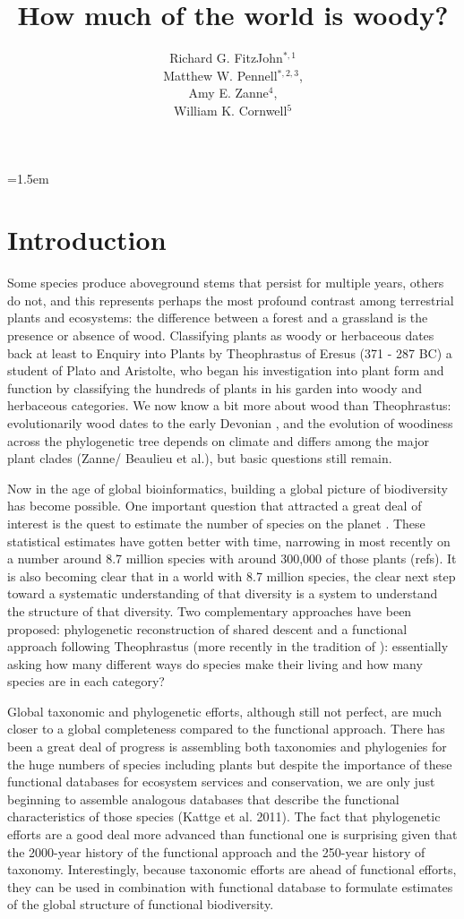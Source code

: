 \documentclass[12pt]{article}
\title{How much of the world is woody?}
\author{
Richard G. FitzJohn$^{*,1}$\\ Matthew W. Pennell$^{*,2,3}$,\\ Amy E. Zanne$^{4}$,\\ William K. Cornwell$^{5}$
}
\date{}
\affiliation{\noindent
$^*$ These authors contributed equally}
\begin{document}
\mstitlepage
\parindent=1.5em
\addtolength{\parskip}{.3em}

\section{Introduction}

Some species produce aboveground stems that persist for multiple years, others do not, and this represents perhaps the most profound contrast among terrestrial plants and ecosystems: the difference between a forest and a grassland is the presence or absence of wood. Classifying plants as woody or herbaceous dates back at least to Enquiry into Plants by Theophrastus of Eresus (371 - 287 BC) a student of Plato and Aristolte, who began his investigation into plant form and function by classifying the hundreds of plants in his garden into woody and herbaceous categories.  We now know a bit more about wood than Theophrastus: evolutionarily wood dates to the early Devonian \citep[~400 mya;][]{gerrienne2011simple}, and the evolution of woodiness across the phylogenetic tree depends on climate and differs among the major plant clades (Zanne/ Beaulieu et al.), but basic questions still remain.

Now in the age of global bioinformatics, building a global picture of biodiversity has become possible.  One important question that attracted a great deal of interest is the quest to estimate the number of species on the planet \citep{may1988many,erwin1991many, stork1993many, mora2011plos}.  These statistical estimates have gotten better with time, narrowing in most recently on a number around 8.7 million species with around 300,000 of those plants (refs).  It is also becoming clear that in a world with 8.7 million species, the clear next step toward a systematic understanding of that diversity is a system to understand the structure of that diversity.  Two complementary approaches have been proposed: phylogenetic reconstruction of shared descent \citep{smith2011understanding} and a functional approach following Theophrastus (more recently in the tradition of \citep{grime1979plant, weiher2009challenging, westoby2002plant}): essentially asking how many different ways do species make their living and how many species are in each category?

Global taxonomic and phylogenetic efforts, although still not perfect, are much closer to a global completeness compared to the functional approach.   There has been a great deal of progress is assembling both taxonomies and phylogenies for the huge numbers of species including plants \citep{smith2011understanding} but despite the importance of these functional databases for ecosystem services and conservation, we are only just beginning to assemble analogous databases that describe the functional characteristics of those species (Kattge et al. 2011).   The fact that phylogenetic efforts are a good deal more advanced than functional one is surprising given that the 2000-year history of the functional approach and the 250-year history of taxonomy.  Interestingly, because taxonomic efforts are ahead of functional efforts, they can be used in combination with functional database to formulate estimates of the global structure of functional biodiversity.
\end{document}
